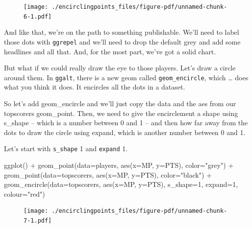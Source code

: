 \documentclass[
  letterpaper,
  DIV=11,
  numbers=noendperiod]{scrreprt}
\newenvironment{Shaded}{\begin{snugshade}}{\end{snugshade}}
\newcommand{\AttributeTok}[1]{\textcolor[rgb]{0.40,0.45,0.13}{#1}}
\newcommand{\DecValTok}[1]{\textcolor[rgb]{0.68,0.00,0.00}{#1}}
\newcommand{\FunctionTok}[1]{\textcolor[rgb]{0.28,0.35,0.67}{#1}}
\newcommand{\NormalTok}[1]{\textcolor[rgb]{0.00,0.23,0.31}{#1}}
\newcommand{\SpecialCharTok}[1]{\textcolor[rgb]{0.37,0.37,0.37}{#1}}
\newcommand{\StringTok}[1]{\textcolor[rgb]{0.13,0.47,0.30}{#1}}
\begin{document}
\begin{figure}[H]

{\centering \texttt{[image: ./encirclingpoints\_files/figure-pdf/unnamed-chunk-6-1.pdf]}

}

\end{figure}

And like that, we're on the path to something publishable. We'll need to
label those dots with \texttt{ggrepel} and we'll need to drop the
default grey and add some headlines and all that. And, for the most
part, we've got a solid chart.

But what if we could really draw the eye to those players. Let's draw a
circle around them. In \texttt{ggalt}, there is a new geom called
\texttt{geom\_encircle}, which \ldots{} does what you think it does. It
encircles all the dots in a dataset.

So let's add geom\_encircle and we'll just copy the data and the aes
from our topscorers geom\_point. Then, we need to give the encirclement
a shape using s\_shape -- which is a number between 0 and 1 -- and then
how far away from the dots to draw the circle using expand, which is
another number between 0 and 1.

Let's start with \texttt{s\_shape} 1 and \texttt{expand} 1.

\begin{Shaded}
\begin{Highlighting}[]
\FunctionTok{ggplot}\NormalTok{() }\SpecialCharTok{+} 
  \FunctionTok{geom\_point}\NormalTok{(}\AttributeTok{data=}\NormalTok{players, }\FunctionTok{aes}\NormalTok{(}\AttributeTok{x=}\NormalTok{MP, }\AttributeTok{y=}\NormalTok{PTS), }\AttributeTok{color=}\StringTok{"grey"}\NormalTok{) }\SpecialCharTok{+} 
  \FunctionTok{geom\_point}\NormalTok{(}\AttributeTok{data=}\NormalTok{topscorers, }\FunctionTok{aes}\NormalTok{(}\AttributeTok{x=}\NormalTok{MP, }\AttributeTok{y=}\NormalTok{PTS), }\AttributeTok{color=}\StringTok{"black"}\NormalTok{) }\SpecialCharTok{+} 
  \FunctionTok{geom\_encircle}\NormalTok{(}\AttributeTok{data=}\NormalTok{topscorers, }\FunctionTok{aes}\NormalTok{(}\AttributeTok{x=}\NormalTok{MP, }\AttributeTok{y=}\NormalTok{PTS), }\AttributeTok{s\_shape=}\DecValTok{1}\NormalTok{, }\AttributeTok{expand=}\DecValTok{1}\NormalTok{, }\AttributeTok{colour=}\StringTok{"red"}\NormalTok{)}
\end{Highlighting}
\end{Shaded}

\begin{figure}[H]

{\centering \texttt{[image: ./encirclingpoints\_files/figure-pdf/unnamed-chunk-7-1.pdf]}

}

\end{figure}
\end{document}
